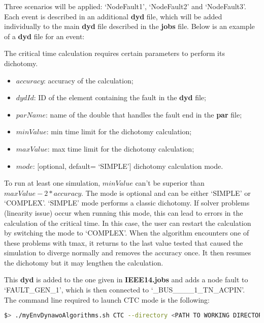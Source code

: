 \documentclass[a4paper, 12pt]{report}
\begin{document}
Three scenarios will be applied: `NodeFault1', `NodeFault2' and `NodeFault3'. Each event is described in an additional \textbf{dyd} file, which will be added individually to the main \textbf{dyd} file described in the \textbf{jobs} file.
Below is an example of a \textbf{dyd} file for an event:



The critical time calculation requires certain parameters to perform its dichotomy.
\begin{itemize}
  \item $accuracy$: accuracy of the calculation;
  \item $dydId$: ID of the element containing the fault in the \textbf{dyd} file;
  \item $parName$: name of the double that handles the fault end in the \textbf{par} file;
  \item $minValue$: min time limit for the dichotomy calculation;
  \item $maxValue$: max time limit for the dichotomy calculation;
  \item $mode$: [optional, default= `SIMPLE'] dichotomy calculation mode.
\end{itemize}
To run at least one simulation, $minValue$ can't be superior than $maxValue - 2 * accuracy$.
The mode is optional and can be either `SIMPLE' or `COMPLEX'. `SIMPLE' mode performs a classic dichotomy. If solver problems (linearity issue) occur when running this mode, this can lead to errors in the calculation of the critical time. In this case, the user can restart the calculation by switching the mode to `COMPLEX'. When the algorithm encounters one of these problems with tmax, it returns to the last value tested that caused the simulation to diverge normally and removes the accuracy once. It then resumes the dichotomy but it may lengthen the calculation.

This \textbf{dyd} is added to the one given in \textbf{IEEE14.jobs} and adds a node fault to `FAULT\_GEN\_1', which is then connected to `\_BUS\_\_\_\_1\_TN\_ACPIN'.\\

The command line required to launch CTC mode is the following:

\begin{lstlisting}[language=bash, breaklines=true, breakatwhitespace=false]
$> ./myEnvDynawoAlgorithms.sh CTC --directory <PATH TO WORKING DIRECTORY> --input <NAME OF INPUT FILE> --output <NAME OF OUTPUT FILE> --nbThreads <NUMBER OF THREADS>
\end{lstlisting}
\end{document}
